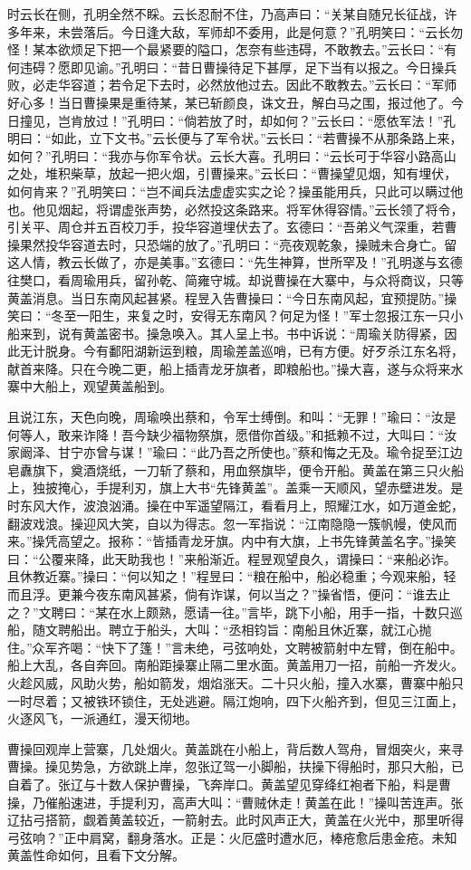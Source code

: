 时云长在侧，孔明全然不睬。云长忍耐不住，乃高声曰：“关某自随兄长征战，许多年来，未尝落后。今日逢大敌，军师却不委用，此是何意？”孔明笑曰：“云长勿怪！某本欲烦足下把一个最紧要的隘口，怎奈有些违碍，不敢教去。”云长曰：“有何违碍？愿即见谕。”孔明曰：“昔日曹操待足下甚厚，足下当有以报之。今日操兵败，必走华容道；若令足下去时，必然放他过去。因此不敢教去。”云长曰：“军师好心多！当日曹操果是重待某，某已斩颜良，诛文丑，解白马之围，报过他了。今日撞见，岂肯放过！”孔明曰：“倘若放了时，却如何？”云长曰：“愿依军法！”孔明曰：“如此，立下文书。”云长便与了军令状。”云长曰：“若曹操不从那条路上来，如何？”孔明曰：“我亦与你军令状。云长大喜。孔明曰：“云长可于华容小路高山之处，堆积柴草，放起一把火烟，引曹操来。”云长曰：“曹操望见烟，知有埋伏，如何肯来？”孔明笑曰：“岂不闻兵法虚虚实实之论？操虽能用兵，只此可以瞒过他也。他见烟起，将谓虚张声势，必然投这条路来。将军休得容情。”云长领了将令，引关平、周仓并五百校刀手，投华容道埋伏去了。玄德曰：“吾弟义气深重，若曹操果然投华容道去时，只恐端的放了。”孔明曰：“亮夜观乾象，操贼未合身亡。留这人情，教云长做了，亦是美事。”玄德曰：“先生神算，世所罕及！”孔明遂与玄德往樊口，看周瑜用兵，留孙乾、简雍守城。却说曹操在大寨中，与众将商议，只等黄盖消息。当日东南风起甚紧。程昱入告曹操曰：“今日东南风起，宜预提防。”操笑曰：“冬至一阳生，来复之时，安得无东南风？何足为怪！”军士忽报江东一只小船来到，说有黄盖密书。操急唤入。其人呈上书。书中诉说：“周瑜关防得紧，因此无计脱身。今有鄱阳湖新运到粮，周瑜差盖巡哨，已有方便。好歹杀江东名将，献首来降。只在今晚二更，船上插青龙牙旗者，即粮船也。”操大喜，遂与众将来水寨中大船上，观望黄盖船到。

且说江东，天色向晚，周瑜唤出蔡和，令军士缚倒。和叫：“无罪！”瑜曰：“汝是何等人，敢来诈降！吾今缺少福物祭旗，愿借你首级。”和抵赖不过，大叫曰：“汝家阚泽、甘宁亦曾与谋！”瑜曰：“此乃吾之所使也。”蔡和悔之无及。瑜令捉至江边皂纛旗下，奠酒烧纸，一刀斩了蔡和，用血祭旗毕，便令开船。黄盖在第三只火船上，独披掩心，手提利刃，旗上大书“先锋黄盖”。盖乘一天顺风，望赤壁进发。是时东风大作，波浪汹涌。操在中军遥望隔江，看看月上，照耀江水，如万道金蛇，翻波戏浪。操迎风大笑，自以为得志。忽一军指说：“江南隐隐一簇帆幔，使风而来。”操凭高望之。报称：“皆插青龙牙旗。内中有大旗，上书先锋黄盖名字。”操笑曰：“公覆来降，此天助我也！”来船渐近。程昱观望良久，谓操曰：“来船必诈。且休教近寨。”操曰：“何以知之！”程昱曰：“粮在船中，船必稳重；今观来船，轻而且浮。更兼今夜东南风甚紧，倘有诈谋，何以当之？”操省悟，便问：“谁去止之？”文聘曰：“某在水上颇熟，愿请一往。”言毕，跳下小船，用手一指，十数只巡船，随文聘船出。聘立于船头，大叫：“丞相钧旨：南船且休近寨，就江心抛住。”众军齐喝：“快下了篷！”言未绝，弓弦响处，文聘被箭射中左臂，倒在船中。船上大乱，各自奔回。南船距操寨止隔二里水面。黄盖用刀一招，前船一齐发火。火趁风威，风助火势，船如箭发，烟焰涨天。二十只火船，撞入水寨，曹寨中船只一时尽着；又被铁环锁住，无处逃避。隔江炮响，四下火船齐到，但见三江面上，火逐风飞，一派通红，漫天彻地。

曹操回观岸上营寨，几处烟火。黄盖跳在小船上，背后数人驾舟，冒烟突火，来寻曹操。操见势急，方欲跳上岸，忽张辽驾一小脚船，扶操下得船时，那只大船，已自着了。张辽与十数人保护曹操，飞奔岸口。黄盖望见穿绛红袍者下船，料是曹操，乃催船速进，手提利刃，高声大叫：“曹贼休走！黄盖在此！”操叫苦连声。张辽拈弓搭箭，觑着黄盖较近，一箭射去。此时风声正大，黄盖在火光中，那里听得弓弦响？”正中肩窝，翻身落水。正是：火厄盛时遭水厄，棒疮愈后患金疮。未知黄盖性命如何，且看下文分解。
